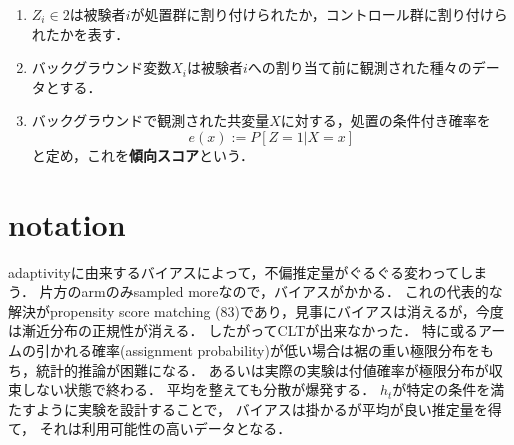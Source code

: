 \documentclass[uplatex,dvipdfmx]{jsreport}
\begin{document}
\begin{definition}\mbox{}
    \begin{enumerate}
        \item $Z_i\in 2$は被験者$i$が処置群に割り付けられたか，コントロール群に割り付けられたかを表す．
        \item バックグラウンド変数$X_i$は被験者$i$への割り当て前に観測された種々のデータとする．
        \item バックグラウンドで観測された共変量$X$に対する，処置の条件付き確率を
        \[e(x):=P[Z=1|X=x]\]
        と定め，これを\textbf{傾向スコア}という．
    \end{enumerate}
\end{definition}

\section{notation}

\begin{tcolorbox}[colframe=ForestGreen, colback=ForestGreen!10!white,breakable,colbacktitle=ForestGreen!40!white,coltitle=black,fonttitle=\bfseries\sffamily,
title=RosenbaumとRubinを超えていく]
    adaptivityに由来するバイアスによって，不偏推定量がぐるぐる変わってしまう．
    片方のarmのみsampled moreなので，バイアスがかかる．
    これの代表的な解決がpropensity score matching (83)であり，見事にバイアスは消えるが，今度は漸近分布の正規性が消える．
    したがってCLTが出来なかった．
    特に或るアームの引かれる確率(assignment probability)が低い場合は裾の重い極限分布をもち，統計的推論が困難になる．
    あるいは実際の実験は付値確率が極限分布が収束しない状態で終わる．
    平均を整えても分散が爆発する．
    $h_t$が特定の条件を満たすように実験を設計することで，
    バイアスは掛かるが平均が良い推定量を得て，
    それは利用可能性の高いデータとなる．
\end{tcolorbox}
\end{document}
